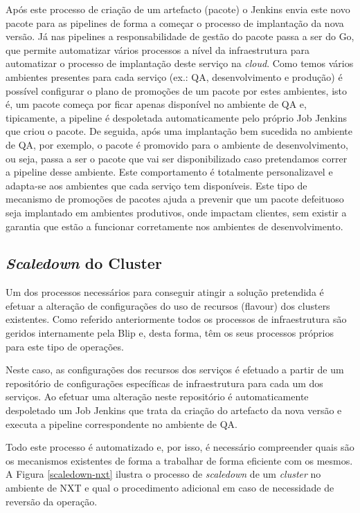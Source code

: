 Após este processo de criação de um artefacto (pacote) o Jenkins envia este novo pacote para as
\glspl{pipeline} de forma a começar o processo de implantação da nova versão. Já nas \glspl{pipeline}
a responsabilidade de gestão do pacote passa a ser do Go, que permite automatizar vários processos
a nível da infraestrutura para automatizar o processo de implantação deste serviço na \textit{cloud}.
Como temos vários ambientes presentes para cada serviço (ex.: QA, desenvolvimento e produção)
é possível configurar o plano de promoções de um pacote por estes ambientes, isto é, um pacote
começa por ficar apenas disponível no ambiente de QA e, tipicamente, a \gls{pipeline} é despoletada
automaticamente pelo próprio Job Jenkins que criou o pacote. De seguida, após uma implantação
bem sucedida no ambiente de QA, por exemplo, o pacote é promovido para o ambiente de desenvolvimento,
ou seja, passa a ser o pacote que vai ser disponibilizado caso pretendamos correr a \gls{pipeline}
desse ambiente. Este comportamento é totalmente personalizavel e adapta-se aos ambientes que cada
serviço tem disponíveis. Este tipo de mecanismo de promoções de pacotes ajuda a prevenir que um
pacote defeituoso seja implantado em ambientes produtivos, onde impactam clientes, sem existir
a garantia que estão a funcionar corretamente nos ambientes de desenvolvimento.

\subsection{\textit{Scaledown} do Cluster}

Um dos processos necessários para conseguir atingir a solução pretendida é efetuar a alteração
de configurações do uso de recursos (\gls{flavour}) dos \glspl{cluster} existentes. Como
referido anteriormente todos os processos de infraestrutura são geridos internamente pela Blip e,
desta forma, têm os seus processos próprios para este tipo de operações.

Neste caso, as configurações dos recursos dos serviços é efetuado a partir de um repositório 
de configurações específicas de infraestrutura para cada um dos serviços. Ao efetuar uma alteração
neste repositório é automaticamente despoletado um Job Jenkins que trata da criação do artefacto
da nova versão e executa a \gls{pipeline} correspondente no ambiente de \ac{QA}.

Todo este processo é automatizado e, por isso, é necessário compreender quais são os mecanismos
existentes de forma a trabalhar de forma eficiente com os mesmos. A Figura \ref{scaledown-nxt} 
ilustra o processo de \textit{scaledown} de um \textit{cluster} no ambiente de NXT e qual o 
procedimento adicional em caso de necessidade de reversão da operação.


